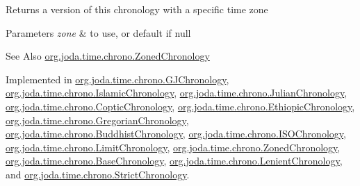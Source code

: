 \begin{DoxyReturn}{Returns}
a version of this chronology with a specific time zone 
\end{DoxyReturn}

\begin{DoxyParams}{Parameters}
{\em zone} & to use, or default if null \\
\hline
\end{DoxyParams}
\begin{DoxySeeAlso}{See Also}
\hyperlink{classorg_1_1joda_1_1time_1_1chrono_1_1_zoned_chronology}{org.\-joda.\-time.\-chrono.\-Zoned\-Chronology} 
\end{DoxySeeAlso}


Implemented in \hyperlink{classorg_1_1joda_1_1time_1_1chrono_1_1_g_j_chronology_a8c843958ed05dc4bddd6e6ce676f72c7}{org.\-joda.\-time.\-chrono.\-G\-J\-Chronology}, \hyperlink{classorg_1_1joda_1_1time_1_1chrono_1_1_islamic_chronology_ad17248ceefe5fa88a20987a2c7e2a382}{org.\-joda.\-time.\-chrono.\-Islamic\-Chronology}, \hyperlink{classorg_1_1joda_1_1time_1_1chrono_1_1_julian_chronology_a7992fd3ac05229a3d4982921da45d7c0}{org.\-joda.\-time.\-chrono.\-Julian\-Chronology}, \hyperlink{classorg_1_1joda_1_1time_1_1chrono_1_1_coptic_chronology_a9ec2df548a651ae84941d4b2657f357b}{org.\-joda.\-time.\-chrono.\-Coptic\-Chronology}, \hyperlink{classorg_1_1joda_1_1time_1_1chrono_1_1_ethiopic_chronology_aa50dced9f21c322b19c78de8cedec8b3}{org.\-joda.\-time.\-chrono.\-Ethiopic\-Chronology}, \hyperlink{classorg_1_1joda_1_1time_1_1chrono_1_1_gregorian_chronology_a27c4655f880e7ee0076fe3a76500bdf3}{org.\-joda.\-time.\-chrono.\-Gregorian\-Chronology}, \hyperlink{classorg_1_1joda_1_1time_1_1chrono_1_1_buddhist_chronology_a0772537c3cf1053567e7f80a54a08e1d}{org.\-joda.\-time.\-chrono.\-Buddhist\-Chronology}, \hyperlink{classorg_1_1joda_1_1time_1_1chrono_1_1_i_s_o_chronology_a47a4189635c657fbe33b0ec721a83c4a}{org.\-joda.\-time.\-chrono.\-I\-S\-O\-Chronology}, \hyperlink{classorg_1_1joda_1_1time_1_1chrono_1_1_limit_chronology_a1bf129c988007fb617433ab45908a949}{org.\-joda.\-time.\-chrono.\-Limit\-Chronology}, \hyperlink{classorg_1_1joda_1_1time_1_1chrono_1_1_zoned_chronology_ad193ee3a2c8a683d1d61d9bf4ebe8883}{org.\-joda.\-time.\-chrono.\-Zoned\-Chronology}, \hyperlink{classorg_1_1joda_1_1time_1_1chrono_1_1_base_chronology_a63d48bcfe7b36b349c8afb8289b94b0b}{org.\-joda.\-time.\-chrono.\-Base\-Chronology}, \hyperlink{classorg_1_1joda_1_1time_1_1chrono_1_1_lenient_chronology_aeaa022f3ad6c8d37b76a6bd7d9bb63a2}{org.\-joda.\-time.\-chrono.\-Lenient\-Chronology}, and \hyperlink{classorg_1_1joda_1_1time_1_1chrono_1_1_strict_chronology_a793db42513ea32a4e856735e6a39da61}{org.\-joda.\-time.\-chrono.\-Strict\-Chronology}.

